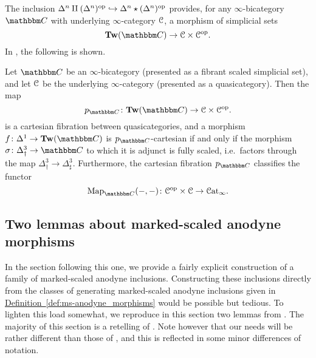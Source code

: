 \documentclass[main.tex]{subfiles}
\begin{document}
The inclusion $\Delta^{n} \amalg (\Delta^{n})^{\mathrm{op}} \hookrightarrow \Delta^{n} \star (\Delta^{n})^{\mathrm{op}}$ provides, for any $\infty$-bicategory $\CC$ with underlying $\infty$-category $\mathcal{C}$, a morphism of simplicial sets
\begin{equation*}
  \Tw(\CC) \to \category{C} \times \category{C}\op.
\end{equation*}
In \cite{garcia2020enhanced}, the following is shown.

\begin{theorem}
  \label{thm:mainthm_walker_fernando}
  Let $\CC$ be an $\infty$-bicategory (presented as a fibrant scaled simplicial set), and let $\mathcal{C}$ be the underlying $\infty$-category (presented as a quasicategory). Then the map
  \begin{equation*}
    p_{\CC}\colon \Tw(\CC) \to \category{C} \times \category{C}\op.
  \end{equation*}
  is a cartesian fibration between quasicategories, and a morphism $f\colon \Delta^{1} \to \Tw(\CC)$ is $p_{\CC}$-cartesian if and only if the morphism $\sigma\colon \Delta^{3}_{\dagger} \to \CC$ to which it is adjunct is fully scaled, i.e.\ factors through the map $\Delta^{3}_{\dagger} \to \Delta^{3}_{\sharp}$. Furthermore, the cartesian fibration $p_{\CC}$ classifies the functor
  \begin{equation*}
    \Map_{\CC}(-, -)\colon \category{C}\op \times \category{C} \to \ICat.
  \end{equation*}
\end{theorem}

%

\subsection{Two lemmas about marked-scaled anodyne morphisms}
\label{ssc:two_lemmas_about_marked_scaled_anodyne_morphisms}

In the section following this one, we provide a fairly explicit construction of a family of marked-scaled anodyne inclusions. Constructing these inclusions directly from the classes of generating marked-scaled anodyne inclusions given in \hyperref[def:ms-anodyne_morphisms]{Definition~\ref*{def:ms-anodyne_morphisms}} would be possible but tedious. To lighten this load somewhat, we reproduce in this section two lemmas from \cite{garcia2cartesianfibrationsii}. The majority of this section is a retelling of \cite[Sec.~2.3~and~2.4]{garcia2cartesianfibrationsii}. Note however that our needs will be rather different than those of \cite{garcia2cartesianfibrationsii}, and this is reflected in some minor differences of notation.
\end{document}
